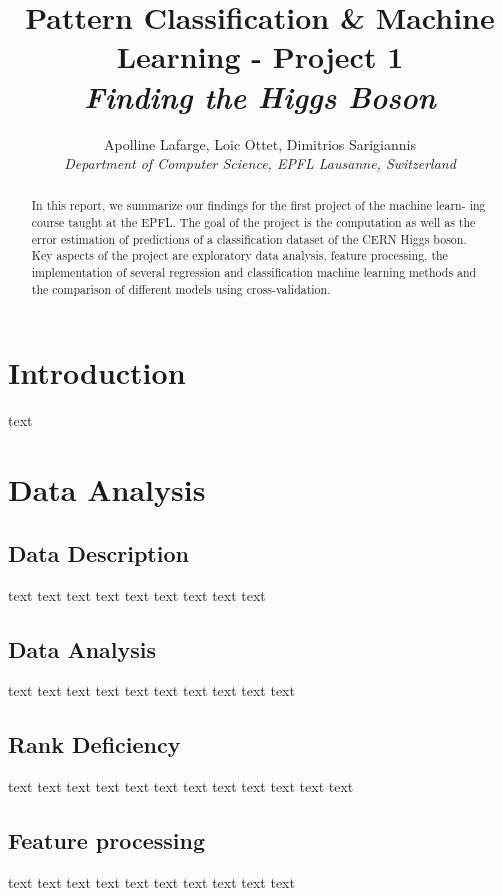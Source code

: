 \documentclass[10pt,conference,compsocconf]{IEEEtran}
\begin{document}
\title{Pattern Classification \& Machine Learning - Project 1 \\ \textit{Finding the Higgs Boson}}

\author{
  Apolline Lafarge, Loic Ottet, Dimitrios Sarigiannis\\
  \textit{Department of Computer Science, EPFL Lausanne, Switzerland}
}

\maketitle

\begin{abstract}
In this report, we summarize our findings for the first project of the machine learn-
ing course taught at the EPFL. The goal of the project is the computation as well as
the error estimation of predictions of a classification dataset of the CERN Higgs boson.
Key aspects of the project are exploratory data analysis, feature processing, the
implementation of several regression and classification machine learning methods and the comparison of different models using cross-validation.
\end{abstract}

\section{Introduction}
text 
\section{Data Analysis}
\subsection{Data Description}
text text text text text text text text text 
\subsection{Data Analysis}
text text text text text text text text text text 
\subsection{Rank Deficiency}
text text text text text text text text text text text text 
\subsection{Feature processing}
text text text text text text text text text text 
\end{document}
